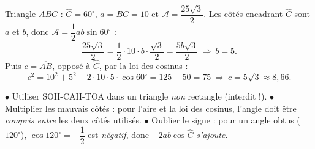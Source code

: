 \documentclass[11pt,a4paper]{article}
\newcommand{\degr}{^{\circ}}
\begin{document}
\begin{exemple}
Triangle $ABC$ : $\hat C=60\degr$, $a=\overline{BC}=10$ et $\mathcal{A}=\dfrac{25\sqrt3}{2}$. Les côtés
encadrant $\hat C$ sont $a$ et $b$, donc $\mathcal{A}=\dfrac12ab\sin60\degr$ :
\[
\frac{25\sqrt3}{2}=\frac12\cdot10\cdot b\cdot\frac{\sqrt3}{2}=\frac{5b\sqrt3}{2}\ \Longrightarrow\ b=5.
\]
Puis $c=\overline{AB}$, opposé à $\hat C$, par la loi des cosinus :
\[
c^2=10^2+5^2-2\cdot10\cdot5\cdot\cos60\degr=125-50=75\ \Longrightarrow\ c=5\sqrt3\approx8{,}66.
\]
\end{exemple}

\begin{piege}
$\bullet$ Utiliser SOH-CAH-TOA dans un triangle \emph{non} rectangle (interdit !).\quad
$\bullet$ Multiplier les mauvais côtés : pour l'aire et la loi des cosinus, l'angle doit être
\emph{compris entre} les deux côtés utilisés.\quad
$\bullet$ Oublier le signe : pour un angle obtus ($120\degr$), $\cos120\degr=-\dfrac12$ est
\emph{négatif}, donc $-2ab\cos\hat C$ \emph{s'ajoute}.
\end{piege}
\end{document}
